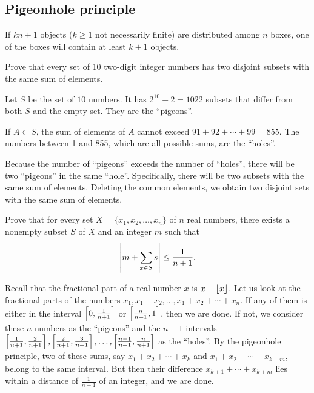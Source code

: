 \subsection{Pigeonhole principle}
\begin{theorem}
If $kn+1$ objects ($k\ge1$ not necessarily finite) are distributed among $n$ boxes, one of the boxes will contain at least $k+1$ objects.
\end{theorem}

\begin{exercise}[IMO 1972]
Prove that every set of 10 two-digit integer numbers has two disjoint subsets with the same sum of elements.
\end{exercise}

\begin{solution}
Let $S$ be the set of $10$ numbers. It has $2^{10}-2=1022$ subsets that differ from both $S$ and the empty set. They are the ``pigeons''.

If $A\subset S$, the sum of elements of $A$ cannot exceed $91+92+\cdots+99=855$. The numbers between 1 and 855, which are all possible sums, are the ``holes''.

Because the number of ``pigeons'' exceeds the number of ``holes'', there will be two ``pigeons'' in the same ``hole''. Specifically, there will be two subsets with the same sum of elements. Deleting the common elements, we obtain two disjoint sets with the same sum of elements.
\end{solution}

\begin{exercise}[Putnam 2006]
Prove that for every set $X=\{x_1,x_2,\dots,x_n\}$ of $n$ real numbers, there exists a nonempty subset $S$ of $X$ and an integer $m$ such that
\[\left|m+\sum_{x\in S}s\right|\le\frac{1}{n+1}.\]
\end{exercise}

\begin{solution}
Recall that the fractional part of a real number $x$ is $x-\left\lfloor x \right\rfloor$. Let us look at the fractional parts of the numbers $x_1,x_1+x_2,\dots,x_1+x_2+\cdots+x_n$. If any of them is either in the interval $\left[0,\frac{1}{n+1}\right]$ or $\left[\frac{n}{n+1},1\right]$, then we are done. If not, we consider these $n$ numbers as the ``pigeons'' and the $n-1$ intervals $\left[\frac{1}{n+1},\frac{2}{n+1}\right],\left[\frac{2}{n+1},\frac{3}{n+1}\right],\dots,\left[\frac{n-1}{n+1},\frac{n}{n+1}\right]$ as the ``holes''. By the pigeonhole principle, two of these sums, say $x_1+x_2+\cdots+x_k$ and $x_1+x_2+\cdots+x_{k+m}$, belong to the same interval. But then their difference $x_{k+1}+\cdots+x_{k+m}$ lies within a distance of $\frac{1}{n+1}$ of an integer, and we are done.
\end{solution}
\pagebreak


